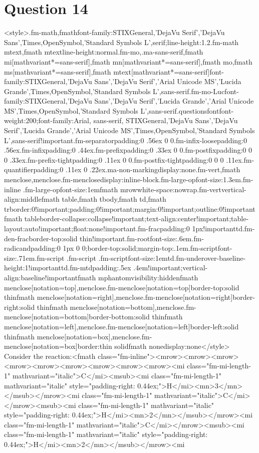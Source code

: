 \documentclass{article}
\begin{document}
\section*{Question 14}
<style>.fm-math,fmath{font-family:STIXGeneral,'DejaVu Serif','DejaVu Sans',Times,OpenSymbol,'Standard Symbols L',serif;line-height:1.2}.fm-math mtext,fmath mtext{line-height:normal}.fm-mo,.ma-sans-serif,fmath mi[mathvariant*=sans-serif],fmath mn[mathvariant*=sans-serif],fmath mo,fmath ms[mathvariant*=sans-serif],fmath mtext[mathvariant*=sans-serif]{font-family:STIXGeneral,'DejaVu Sans','DejaVu Serif','Arial Unicode MS','Lucida Grande',Times,OpenSymbol,'Standard Symbols L',sans-serif}.fm-mo-Luc{font-family:STIXGeneral,'DejaVu Sans','DejaVu Serif','Lucida Grande','Arial Unicode MS',Times,OpenSymbol,'Standard Symbols L',sans-serif}.questionsfont{font-weight:200;font-family:Arial, sans-serif, STIXGeneral,'DejaVu Sans','DejaVu Serif','Lucida Grande','Arial Unicode MS',Times,OpenSymbol,'Standard Symbols L',sans-serif!important}.fm-separator{padding:0 .56ex 0 0}.fm-infix-loose{padding:0 .56ex}.fm-infix{padding:0 .44ex}.fm-prefix{padding:0 .33ex 0 0}.fm-postfix{padding:0 0 0 .33ex}.fm-prefix-tight{padding:0 .11ex 0 0}.fm-postfix-tight{padding:0 0 0 .11ex}.fm-quantifier{padding:0 .11ex 0 .22ex}.ma-non-marking{display:none}.fm-vert,fmath menclose,menclose.fm-menclose{display:inline-block}.fm-large-op{font-size:1.3em}.fm-inline .fm-large-op{font-size:1em}fmath mrow{white-space:nowrap}.fm-vert{vertical-align:middle}fmath table,fmath tbody,fmath td,fmath tr{border:0!important;padding:0!important;margin:0!important;outline:0!important}fmath table{border-collapse:collapse!important;text-align:center!important;table-layout:auto!important;float:none!important}.fm-frac{padding:0 1px!important}td.fm-den-frac{border-top:solid thin!important}.fm-root{font-size:.6em}.fm-radicand{padding:0 1px 0 0;border-top:solid;margin-top:.1em}.fm-script{font-size:.71em}.fm-script .fm-script .fm-script{font-size:1em}td.fm-underover-base{line-height:1!important}td.fm-mtd{padding:.5ex .4em!important;vertical-align:baseline!important}fmath mphantom{visibility:hidden}fmath menclose[notation=top],menclose.fm-menclose[notation=top]{border-top:solid thin}fmath menclose[notation=right],menclose.fm-menclose[notation=right]{border-right:solid thin}fmath menclose[notation=bottom],menclose.fm-menclose[notation=bottom]{border-bottom:solid thin}fmath menclose[notation=left],menclose.fm-menclose[notation=left]{border-left:solid thin}fmath menclose[notation=box],menclose.fm-menclose[notation=box]{border:thin solid}fmath none{display:none}</style> Consider the reaction:\newline<fmath class="fm-inline"><mrow><mrow><mrow><mrow><mrow><mrow><mrow><mrow><mrow><mi class="fm-mi-length-1" mathvariant="italic">C</mi><msub><mi class="fm-mi-length-1" mathvariant="italic" style="padding-right: 0.44ex;">H</mi><mn>3</mn></msub></mrow><mi class="fm-mi-length-1" mathvariant="italic">C</mi></mrow><msub><mi class="fm-mi-length-1" mathvariant="italic" style="padding-right: 0.44ex;">H</mi><mn>2</mn></msub></mrow><mi class="fm-mi-length-1" mathvariant="italic">C</mi></mrow><msub><mi class="fm-mi-length-1" mathvariant="italic" style="padding-right: 0.44ex;">H</mi><mn>2</mn></msub></mrow><mi 
\end{document}

